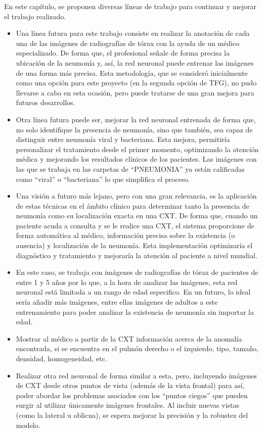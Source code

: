 
En este capítulo, se proponen diversas líneas de trabajo para continuar y mejorar el trabajo realizado.

\begin{itemize}
    \item Una línea futura para este trabajo consiste en realizar la anotación de cada una de las imágenes de radiografías de tórax con la ayuda de un médico especializado. De forma que, el profesional señale de forma precisa la ubicación de la neumonía y, así, la red neuronal puede entrenar las imágenes de una forma más precisa. Esta metodología, que se consideró inicialmente como una opción para este proyecto (en la segunda opción de TFG), no pudo llevarse a cabo en esta ocasión, pero puede tratarse de una gran mejora para futuros desarrollos.
    \item Otra línea futura puede ser, mejorar la red neuronal entrenada de forma que, no solo identifique la presencia de neumonía, sino que también, sea capaz de distinguir entre neumonía viral y bacteriana. Esta mejora, permitiría personalizar el tratamiento desde el primer momento, optimizando la atención médica y mejorando los resultados clínicos de los pacientes. Las imágenes con las que se trabaja en las carpetas de ``PNEUMONIA'' ya están calificadas como ``viral'' o ``bacteriana'' lo que simplifica el proceso.
    \item Una visión a futuro más lejano, pero con una gran relevancia, es la aplicación de estas técnicas en el ámbito clínico para determinar tanto la presencia de neumonía como su localización exacta en una CXT. De forma que, cuando un paciente acuda a consulta y se le realice una CXT, el sistema proporcione de forma automática al médico, información precisa sobre la existencia (o ausencia) y localización de la neumonía. Esta implementación optimizaría el diagnóstico y tratamiento y mejoraría la atención al paciente a nivel mundial.
    \item En este caso, se trabaja con imágenes de radiografías de tórax de pacientes de entre 1 y 5 años por lo que, a la hora de analizar las imágenes, esta red neuronal está limitada a un rango de edad especifico. En un futuro, lo ideal sería añadir más imágenes, entre ellas imágenes de adultos a este entrenamiento para poder analizar la existencia de neumonía sin importar la edad.
    \item Mostrar al médico a partir de la CXT información acerca de la anomalía encontrada, si se encuentra en el pulmón derecho o el izquierdo, tipo, tamaño, densidad, homogeneidad, etc. 
    \item Realizar otra red neuronal de forma similar a esta, pero, incluyendo imágenes de CXT desde otros puntos de vista (además de la vista frontal) para así, poder abordar los problemas asociados con los ``puntos ciegos'' que pueden surgir al utilizar únicamente imágenes frontales. Al incluir nuevas vistas (como la lateral u oblicua), se espera mejorar la precisión y la robustez del modelo.
\end{itemize}
